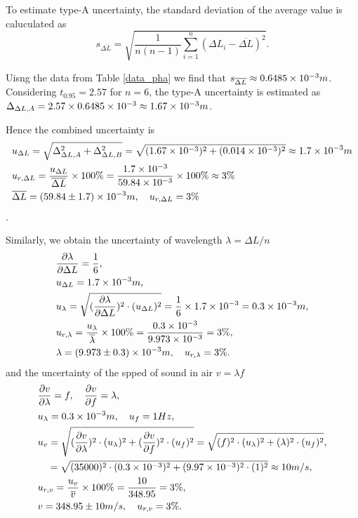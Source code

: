     To estimate type-A uncertainty, the standard deviation of the average value is caluculated as
    \[
        s_{\overline{\Delta L}}=\sqrt{\frac{1}{n(n-1)}\sum_{i=1}^n(\Delta L_i-\overline{\Delta L})^2}.
    \]

    Uisng the data from Table \ref{data_pha} we find that $s_{\overline{\Delta L}}\approx 0.6485\times10^{-3}m$. Considering $t_{0.95}=2.57$ for $n=6$, the type-A uncertainty is estimated as $\Delta_{\Delta L,A}=2.57\times0.6485\times10^{-3}\approx 1.67\times10^{-3}m$.

    Hence the combined uncertainty is 
    \[
    \begin{split}
        &u_{\Delta L}=\sqrt{\Delta_{\Delta L,A}^2+\Delta_{\Delta L,B}^2}=\sqrt{(1.67\times10^{-3})^2+(0.014\times10^{-3})^2}\approx1.7\times10^{-3}m\\
        &u_{r,\Delta L}=\frac{u_{\Delta L}}{\overline{\Delta L}}\times 100\%=\frac{1.7\times10^{-3}}{59.84\times10^{-3}}\times100\%\approx3\%\\
        &\overline{\Delta L}=(59.84\pm 1.7)\times10^{-3}m,\quad u_{r,\Delta L}=3\%
    \end{split}
    \].

    Similarly, we obtain the uncertainty of wavelength $\lambda=\Delta L/n$
    \[
    \begin{split}
        &\frac{\partial \lambda}{\partial \Delta L}=\frac{1}{6},\\
        &u_{\Delta L}=1.7\times10^{-3}m,\\
        &u_{\lambda}=\sqrt{(\frac{\partial \lambda}{\partial \Delta L})^2\cdot (u_{\Delta L})^2}=\frac{1}{6}\times 1.7\times10^{-3}=0.3\times10^{-3}m,\\
        &u_{r,\lambda}=\frac{u_{\lambda}}{\overline{\lambda}}\times 100\%=\frac{0.3\times10^{-3}}{9.973\times10^{-3}}=3\%,\\
        &\lambda=(9.973\pm0.3)\times10^{-3}m,\quad u_{r,\lambda}=3\%.
    \end{split}
    \]
    and the uncertainty of the spped of sound in air $v=\lambda f$
    \[
    \begin{split}
        &\frac{\partial v}{\partial \lambda}=f,\quad \frac{\partial v}{\partial f}=\lambda,\\
        &u_{\lambda}=0.3\times10^{-3}m,\quad u_{f}=1Hz,\\
        &u_{v}=\sqrt{(\frac{\partial v}{\partial \lambda})^2\cdot (u_{\lambda})^2+(\frac{\partial v}{\partial f})^2\cdot (u_{f})^2}=\sqrt{(f)^2\cdot (u_{\lambda})^2+(\lambda)^2\cdot (u_{f})^2},\\
        &\quad =\sqrt{(35000)^2\cdot(0.3\times10^{-3})^2+(9.97\times10^{-3})^2\cdot(1)^2}
        \approx10m/s,\\
        &u_{r,v}=\frac{u_v}{\overline{v}}\times 100\%=\frac{10}{348.95}=3\%,\\
        &v=348.95\pm10 m/s,\quad u_{r,v}=3\%.
    \end{split}
    \]

